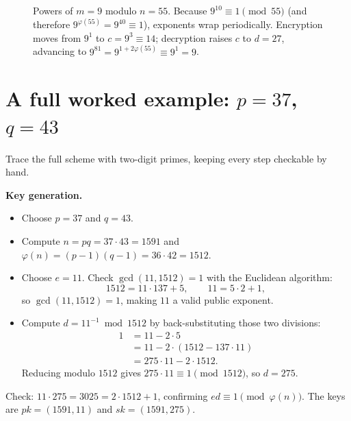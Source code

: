 \begin{figure}[htbp]
\caption{Powers of $m = 9$ modulo $n = 55$. Because $9^{10} \equiv 1 \pmod{55}$ (and therefore $9^{\varphi(55)} = 9^{40} \equiv 1$), exponents wrap periodically. Encryption moves from $9^1$ to $c = 9^3 \equiv 14$; decryption raises $c$ to $d = 27$, advancing to $9^{81} = 9^{1 + 2\varphi(55)} \equiv 9^1 = 9$.}
\label{ch19:fig-exponent-cycle}
\end{figure}

\section{A full worked example: \texorpdfstring{$p=37$, $q=43$}{p=37, q=43}}
\label{ch19:worked}

Trace the full scheme with two-digit primes, keeping every step checkable by hand.

\textbf{Key generation.}
\begin{itemize}
  \item Choose $p = 37$ and $q = 43$.
  \item Compute $n = pq = 37\cdot 43 = 1591$ and $\varphi(n) = (p-1)(q-1) = 36\cdot 42 = 1512$.
  \item Choose $e = 11$. Check $\gcd(11,1512)=1$ with the Euclidean algorithm:
  \[
    1512 = 11\cdot 137 + 5, \qquad 11 = 5\cdot 2 + 1,
  \]
  so $\gcd(11,1512) = 1$, making $11$ a valid public exponent.
  \item Compute $d = 11^{-1}\bmod 1512$ by back-substituting those two divisions:
  \begin{align*}
    1 &= 11 - 2\cdot 5 \\
      &= 11 - 2\cdot(1512 - 137\cdot 11) \\
      &= 275\cdot 11 - 2\cdot 1512.
  \end{align*}
  Reducing modulo $1512$ gives $275\cdot 11 \equiv 1\pmod{1512}$, so $d = 275$.
\end{itemize}
Check: $11\cdot 275 = 3025 = 2\cdot 1512 + 1$, confirming $ed\equiv 1\pmod{\varphi(n)}$. The keys are $pk = (1591, 11)$ and $sk = (1591, 275)$.

